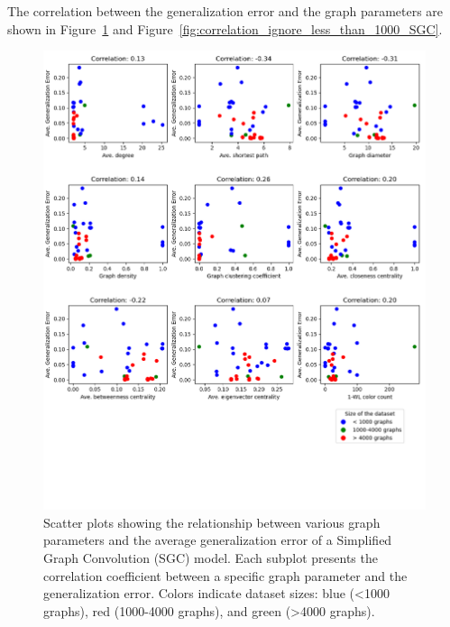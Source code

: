 The correlation between the generalization error and the graph parameters are shown in Figure~\ref{fig:correlation_SGC} and Figure~\ref{fig:correlation_ignore_less_than_1000_SGC}.

\begin{figure}[H]
    \centering
    \includegraphics[width=\textwidth]{images/correlation_SGC.png}
    \caption{Scatter plots showing the relationship between various graph parameters and the average generalization error of a Simplified Graph Convolution (SGC) model. Each subplot presents the correlation coefficient between a specific graph parameter and the generalization error. Colors indicate dataset sizes: blue (<1000 graphs), red (1000-4000 graphs), and green (>4000 graphs).}
    \label{fig:correlation_SGC}
\end{figure}

